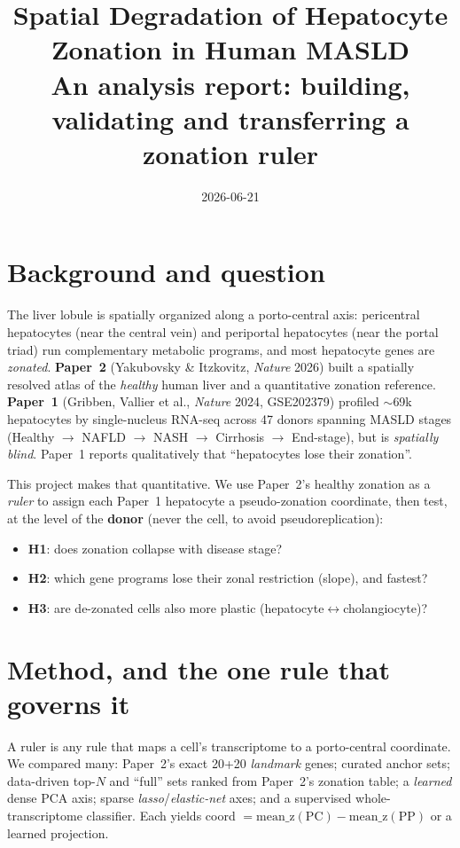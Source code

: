 \documentclass[11pt]{article}
\title{Spatial Degradation of Hepatocyte Zonation in Human MASLD\\
\large An analysis report: building, validating and transferring a zonation ruler}
\author{}\date{2026-06-21}
\begin{document}
\maketitle

\section{Background and question}
The liver lobule is spatially organized along a porto-central axis: pericentral hepatocytes (near
the central vein) and periportal hepatocytes (near the portal triad) run complementary metabolic
programs, and most hepatocyte genes are \emph{zonated}. \textbf{Paper~2} (Yakubovsky \& Itzkovitz,
\emph{Nature} 2026) built a spatially resolved atlas of the \emph{healthy} human liver and a
quantitative zonation reference. \textbf{Paper~1} (Gribben, Vallier et al., \emph{Nature} 2024,
GSE202379) profiled $\sim$69k hepatocytes by single-nucleus RNA-seq across 47 donors spanning
MASLD stages (Healthy $\to$ NAFLD $\to$ NASH $\to$ Cirrhosis $\to$ End-stage), but is
\emph{spatially blind}. Paper~1 reports qualitatively that ``hepatocytes lose their zonation''.

This project makes that quantitative. We use Paper~2's healthy zonation as a \emph{ruler} to assign
each Paper~1 hepatocyte a pseudo-zonation coordinate, then test, at the level of the \textbf{donor}
(never the cell, to avoid pseudoreplication):
\begin{itemize}
\item \textbf{H1}: does zonation collapse with disease stage?
\item \textbf{H2}: which gene programs lose their zonal restriction (slope), and fastest?
\item \textbf{H3}: are de-zonated cells also more plastic (hepatocyte$\leftrightarrow$cholangiocyte)?
\end{itemize}

\section{Method, and the one rule that governs it}
A ruler is any rule that maps a cell's transcriptome to a porto-central coordinate. We compared
many: Paper~2's exact 20+20 \emph{landmark} genes; curated anchor sets; data-driven top-$N$ and
``full'' sets ranked from Paper~2's zonation table; a \emph{learned} dense PCA axis; sparse
\emph{lasso}/\emph{elastic-net} axes; and a supervised whole-transcriptome classifier. Each yields
coord $=\mathrm{mean\_z}(\mathrm{PC})-\mathrm{mean\_z}(\mathrm{PP})$ or a learned projection.
\end{document}
